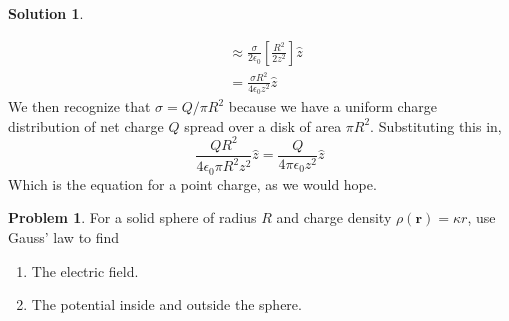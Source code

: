 \documentclass[10pt]{article}
\theoremstyle{definition}
\newtheorem{problem}{Problem}
\newtheorem{soln}{Solution}
\newcommand{\uz}{\hat{z}}
\begin{document}
\begin{soln}
\begin{enumerate}[label=(\alph*)]
\begin{align*}
             & \approx\frac{\sigma}{2\epsilon_0}\left[\frac{R^2}{2z^2}\right] \uz                              \\
             & =\frac{\sigma R^2}{4\epsilon_0z^2}\uz
          \end{align*}
          We then recognize that $\sigma=Q/\pi R^2$ because we have a uniform charge distribution of net charge $Q$ spread over a disk of area $\pi R^2$.
          Substituting this in,
          $$
            \frac{QR^2}{4\epsilon_0\pi R^2z^2}\uz=\frac{Q}{4\pi\epsilon_0 z^2}\uz
          $$
          Which is the equation for a point charge, as we would hope.
  \end{enumerate}
\end{soln}

\begin{problem}
For a solid sphere of radius $R$ and charge density $\rho(\mathbf{r}) = \kappa r$, use Gauss' law to find
\begin{enumerate}[label=(\roman*)]
  \item The electric field.
  \item The potential inside and outside the sphere.
\end{enumerate}
\end{problem}
\end{document}
